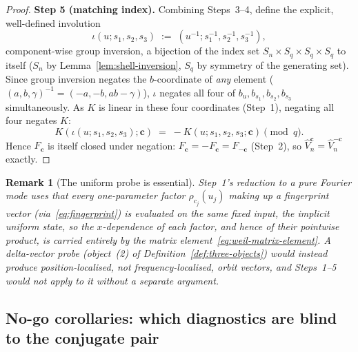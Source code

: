 \documentclass[11pt,a4paper]{article}
\newtheorem{remark}[theorem]{Remark}
\begin{document}
\begin{proof}
      \textbf{Step 5 (matching index).}
      Combining Steps~3--4, define the explicit, well-defined involution
      \begin{equation}
        \label{eq:index-involution}
        \iota(u; s_1,s_2,s_3) \;:=\; (u^{-1}; s_1^{-1}, s_2^{-1}, s_3^{-1}),
      \end{equation}
      component-wise group inversion, a bijection of the index set $S_n \times S_q \times S_q \times
      S_q$ to itself ($S_n$ by Lemma~\ref{lem:shell-inversion}, $S_q$ by symmetry of the generating
      set). Since group inversion negates the $b$-coordinate of \emph{any} element
      ($(a,b,\gamma)^{-1}=(-a,-b,ab-\gamma)$), $\iota$ negates all four of $b_u,b_{s_1},b_{s_2},b_{s_3}$
      simultaneously. As $K$ is linear in these four coordinates (Step~1), negating all four negates
      $K$:
      \begin{equation}
        K(\iota(u;s_1,s_2,s_3);\mathbf{c}) \;=\; -K(u;s_1,s_2,s_3;\mathbf{c}) \pmod q.
      \end{equation}
      Hence $F_{\mathbf{c}}$ is itself closed under negation: $F_{\mathbf{c}} = -F_{\mathbf{c}} =
      F_{-\mathbf{c}}$ (Step~2), so $\widehat V_n^{\mathbf{c}} = \widehat V_n^{-\mathbf{c}}$ exactly.
    \end{proof}

    \begin{remark}[The uniform probe is essential]
      \label{rem:uniform-probe-essential}
      Step~1's reduction to a pure Fourier mode uses that every one-parameter factor
      $\rho_{c_j}(u_j)$ making up a fingerprint vector (via~\eqref{eq:fingerprint}) is evaluated on
      the same fixed input, the implicit uniform state, so the $x$-dependence of each factor, and
      hence of their pointwise product, is carried entirely by the matrix
      element~\eqref{eq:weil-matrix-element}. A
      delta-vector probe (object~(2) of Definition~\ref{def:three-objects}) would instead produce
      position-localised, not frequency-localised, orbit vectors, and Steps~1--5 would not apply to it
      without a separate argument.
    \end{remark}

  \subsection{No-go corollaries: which diagnostics are blind to the conjugate pair}
    \label{subsec:no-go}
\end{document}
